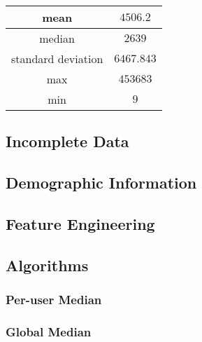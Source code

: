 \documentclass[10pt]{article}
\begin{document}
\begin{center} 
\begin{tabular}{c c} 
\hline 
\hline
mean & $4506.2$ \\ \hline
median &  $2639$ \\ \hline 
standard deviation & $6467.843$ \\ \hline 
max & $453683$ \\ \hline 
min & $9$ \\ \hline 
\hline 
\end{tabular} 
\end{center}



\subsection{Incomplete Data} 

\subsection{Demographic Information} 

\subsection{Feature Engineering} 

\subsection{Algorithms} 

\subsubsection{Per-user Median} 

\subsubsection{Global Median}
\end{document}
